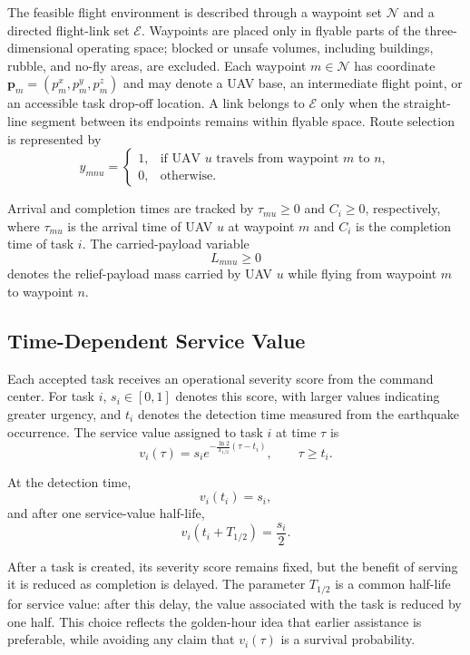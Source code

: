 \documentclass[conference]{IEEEtran}
\begin{document}
The feasible flight environment is described through a waypoint set $\mathcal{N}$ and a directed flight-link set $\mathcal{E}$. Waypoints are placed only in flyable parts of the three-dimensional operating space; blocked or unsafe volumes, including buildings, rubble, and no-fly areas, are excluded. Each waypoint $m\in\mathcal{N}$ has coordinate $\mathbf{p}_m=(p_m^x,p_m^y,p_m^z)$ and may denote a UAV base, an intermediate flight point, or an accessible task drop-off location. A link belongs to $\mathcal{E}$ only when the straight-line segment between its endpoints remains within flyable space. Route selection is represented by
\begin{equation}
y_{mnu}
=
\begin{cases}
1, & \text{if UAV }u\text{ travels from waypoint }m\text{ to }n,\\
0, & \text{otherwise}.
\end{cases}
\end{equation}

Arrival and completion times are tracked by $\tau_{mu}\geq0$ and $C_i\geq0$, respectively, where $\tau_{mu}$ is the arrival time of UAV $u$ at waypoint $m$ and $C_i$ is the completion time of task $i$. The carried-payload variable
\[
L_{mnu}\geq 0
\]
denotes the relief-payload mass carried by UAV $u$ while flying from waypoint $m$ to waypoint $n$.

\subsection{Time-Dependent Service Value}

Each accepted task receives an operational severity score from the command center. For task $i$, $s_i\in[0,1]$ denotes this score, with larger values indicating greater urgency, and $t_i$ denotes the detection time measured from the earthquake occurrence. The service value assigned to task $i$ at time $\tau$ is
\begin{equation}
v_i(\tau)
=
s_i
e^{-\frac{\ln 2}{T_{1/2}}(\tau-t_i)},
\qquad
\tau\geq t_i.
\end{equation}

At the detection time,
\begin{equation}
v_i(t_i)=s_i,
\end{equation}
and after one service-value half-life,
\begin{equation}
v_i(t_i+T_{1/2})
=
\frac{s_i}{2}.
\end{equation}

After a task is created, its severity score remains fixed, but the benefit of serving it is reduced as completion is delayed. The parameter $T_{1/2}$ is a common half-life for service value: after this delay, the value associated with the task is reduced by one half. This choice reflects the golden-hour idea that earlier assistance is preferable, while avoiding any claim that $v_i(\tau)$ is a survival probability.
\end{document}
